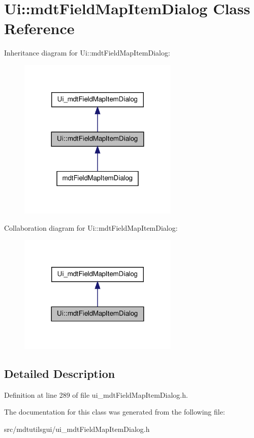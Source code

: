 \hypertarget{class_ui_1_1mdt_field_map_item_dialog}{
\section{Ui::mdtFieldMapItemDialog Class Reference}
\label{class_ui_1_1mdt_field_map_item_dialog}
}


Inheritance diagram for Ui::mdtFieldMapItemDialog:\nopagebreak
\begin{figure}[H]
\begin{center}
\leavevmode
\includegraphics[width=216pt]{class_ui_1_1mdt_field_map_item_dialog__inherit__graph}
\end{center}
\end{figure}


Collaboration diagram for Ui::mdtFieldMapItemDialog:\nopagebreak
\begin{figure}[H]
\begin{center}
\leavevmode
\includegraphics[width=216pt]{class_ui_1_1mdt_field_map_item_dialog__coll__graph}
\end{center}
\end{figure}


\subsection{Detailed Description}


Definition at line 289 of file ui\_\-mdtFieldMapItemDialog.h.



The documentation for this class was generated from the following file:\begin{DoxyCompactItemize}
\item 
src/mdtutilsgui/ui\_\-mdtFieldMapItemDialog.h\end{DoxyCompactItemize}
